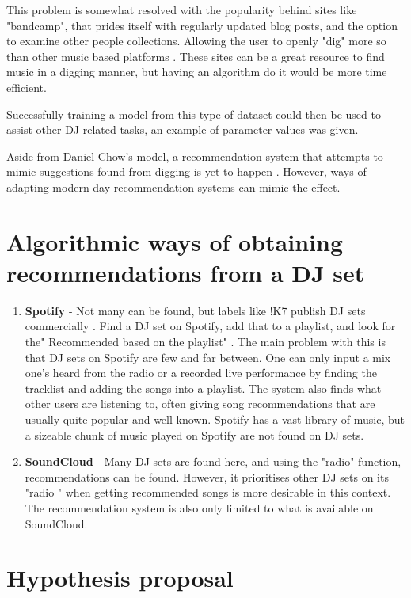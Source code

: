 This problem is somewhat resolved with the popularity behind sites like "bandcamp", that prides itself with regularly updated blog posts, and the option to examine other people collections. Allowing the user to openly "dig" more so than other music based platforms \citep{bandcamp_about_2023}.  These sites can be a great resource to find music in a digging manner, but having an algorithm do it would be more time efficient. 

Successfully training a model from this type of dataset could then be used to assist other DJ related tasks, an example of parameter values was given.

Aside from Daniel Chow's model, a recommendation system that attempts to mimic suggestions found from digging is yet to happen \citep{chow_music_2020}. However, ways of adapting modern day recommendation systems can mimic the effect.

\section{Algorithmic ways of obtaining recommendations from a DJ set}
\begin{enumerate}
	\item \textbf{Spotify }- Not many can be found, but labels like !K7 publish DJ sets commercially \citep{k7_about_2023}.  Find a DJ set on Spotify, add that to a playlist, and look for the"
	Recommended based on the playlist" . The main problem with this is that DJ sets on Spotify are few and far between. One can only input a mix one’s heard from the radio or a recorded live performance by finding the tracklist and adding the songs into a playlist. The system also finds what other users are listening to, often giving song recommendations that are usually quite popular and well-known. Spotify has a vast library of music, but a sizeable chunk of music played on Spotify are not found on DJ sets.
	
	\item \textbf{SoundCloud }- Many DJ sets are found here, and using the "radio" function, recommendations can be found. However, it prioritises other DJ sets on its "radio " when getting recommended songs is more desirable in this context. The recommendation system is also only limited to what is available on SoundCloud.
	
\end{enumerate}

\section{Hypothesis proposal}
	
